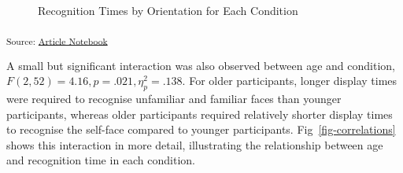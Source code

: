 \documentclass[
  10pt,
  letterpaper,
]{article}
\begin{document}
\label{cell-fig-recognition-times}
\begin{figure}[H]


\caption{\label{fig-recognition-times}Recognition Times by Orientation
for Each Condition}

\end{figure}%

\textsubscript{Source:
\href{https://deborahapthorp.github.io/SelfFaceManuscript/index-preview.html}{Article
Notebook}}

A small but significant interaction was also observed between age and
condition, \(F(2, 52) = 4.16, p = .021, \eta_p^2 = .138\). For older
participants, longer display times were required to recognise unfamiliar
and familiar faces than younger participants, whereas older participants
required relatively shorter display times to recognise the self-face
compared to younger participants. Fig~\ref{fig-correlations} shows this
interaction in more detail, illustrating the relationship between age
and recognition time in each condition.
\end{document}
